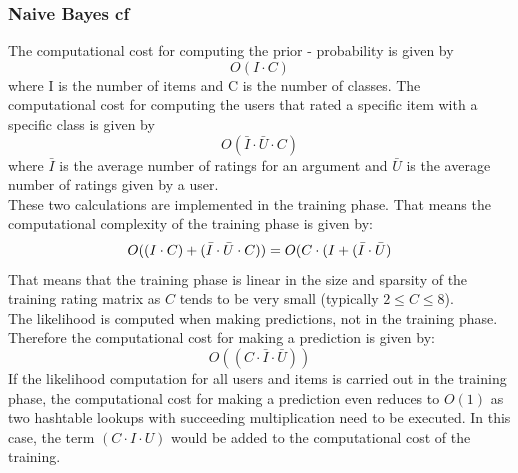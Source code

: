 \subsubsection{Naive Bayes \acrshort{cf}}
The computational cost for computing the prior - probability is given by\\
\begin{equation}
    O(I \cdot C)
\end{equation}
where I is the number of items and C is the number of classes.
The computational cost for computing the users that rated a specific item with a specific class is given by\\
\begin{equation}
    O(\bar{I} \cdot \bar{U} \cdot C)
\end{equation}
where $\bar{I}$ is the average number of ratings for an argument and $\bar{U}$ is the average number of ratings given by a user.\\
These two calculations are implemented in the training phase. That means the computational complexity of the training phase is given by:\\
\begin{equation}
    O((I \cdot C) + (\bar{I} \cdot \bar{U} \cdot C))\\ = O(C \cdot (I + (\bar{I} \cdot \bar{U})
\end{equation}
That means that the training phase is linear in the size and sparsity of the training rating matrix as $C$ tends to be very small (typically $2 \leq C \leq 8$).\\
The likelihood is computed when making predictions, not in the training phase. Therefore the computational cost for making a prediction is given by:\\
\begin{equation}
    O((C \cdot \bar{I} \cdot \bar{U}))
\end{equation}
If the likelihood computation for all users and items is carried out in the training phase, the computational cost for making a prediction even reduces to $O(1)$ as two hashtable lookups with succeeding multiplication need to be executed. In this case, the term $(C \cdot I \cdot U)$ would be added to the computational cost of the training.

